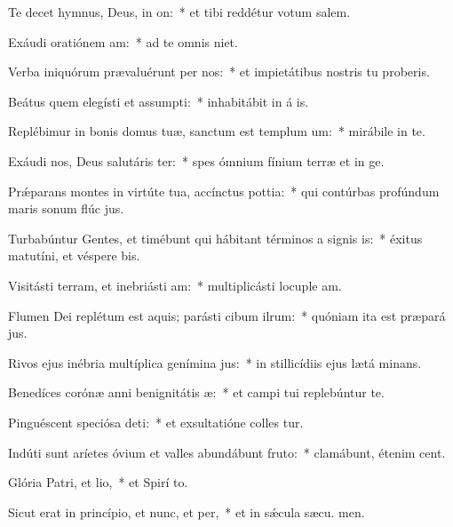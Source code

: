 \item Te decet hymnus, Deus, in on:~* et tibi reddétur votum  salem.
\item Exáudi oratiónem am:~* ad te omnis  niet.
\item Verba iniquórum prævaluérunt per nos:~* et impietátibus nostris tu proberis.
\item Beátus quem elegísti et assumpti:~* inhabitábit in á is.
\item Replébimur in bonis domus tuæ, sanctum est templum um:~* mirábile in te.
\item Exáudi nos, Deus salutáris ter:~* spes ómnium fínium terræ et in  ge.
\item Prǽparans montes in virtúte tua, accínctus pottia:~* qui contúrbas profúndum maris sonum flúc jus.
\item Turbabúntur Gentes, et timébunt qui hábitant términos a signis is:~* éxitus matutíni, et véspere bis.
\item Visitásti terram, et inebriásti am:~* multiplicásti locuple am.
\item Flumen Dei replétum est aquis; parásti cibum ilrum:~* quóniam ita est præpará jus.
\item Rivos ejus inébria multíplica genímina jus:~* in stillicídiis ejus lætá minans.
\item Benedíces corónæ anni benignitátis æ:~* et campi tui replebúntur te.
\item Pinguéscent speciósa deti:~* et exsultatióne colles tur.
\item Indúti sunt aríetes óvium et valles abundábunt fruto:~* clamábunt, étenim  cent.
\item Glória Patri, et lio,~* et Spirí to.
\item Sicut erat in princípio, et nunc, et per,~* et in sǽcula sæcu. men.
